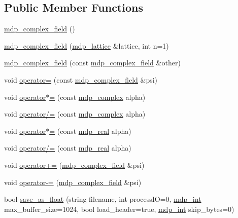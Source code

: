 \subsection*{Public Member Functions}
\begin{DoxyCompactItemize}
\item 
\hyperlink{classmdp__complex__field_aa629a99588ce79fe33fafb6db4f8226a}{mdp\_\-complex\_\-field} ()
\item 
\hyperlink{classmdp__complex__field_a26b3b0f65609dd18e7438329ff651fd1}{mdp\_\-complex\_\-field} (\hyperlink{classmdp__lattice}{mdp\_\-lattice} \&lattice, int n=1)
\item 
\hyperlink{classmdp__complex__field_a68da5a2521de552a614831c39a14930a}{mdp\_\-complex\_\-field} (const \hyperlink{classmdp__complex__field}{mdp\_\-complex\_\-field} \&other)
\item 
void \hyperlink{classmdp__complex__field_ad2b736ae31e3ee1f955c10f6ad40928f}{operator=} (const \hyperlink{classmdp__complex__field}{mdp\_\-complex\_\-field} \&psi)
\item 
void \hyperlink{classmdp__complex__field_a530256e46fe46c7422cbba8381891636}{operator$\ast$=} (const \hyperlink{classmdp__complex}{mdp\_\-complex} alpha)
\item 
void \hyperlink{classmdp__complex__field_ab204658a9026e7936b8725ad4f3172ef}{operator/=} (const \hyperlink{classmdp__complex}{mdp\_\-complex} alpha)
\item 
void \hyperlink{classmdp__complex__field_af890e25006822910f411ce10ba7dfc7a}{operator$\ast$=} (const \hyperlink{mdp__global__vars_8h_a049e4c1d4e74d644878a42f9909463e4}{mdp\_\-real} alpha)
\item 
void \hyperlink{classmdp__complex__field_a0d2bffa4819135c1ef77c0c9fb22504e}{operator/=} (const \hyperlink{mdp__global__vars_8h_a049e4c1d4e74d644878a42f9909463e4}{mdp\_\-real} alpha)
\item 
void \hyperlink{classmdp__complex__field_a2278eac1ee19b8ca1c3c6b7319f6525d}{operator+=} (\hyperlink{classmdp__complex__field}{mdp\_\-complex\_\-field} \&psi)
\item 
void \hyperlink{classmdp__complex__field_a0385e35ddfd532f15e817dcac1adf212}{operator-\/=} (\hyperlink{classmdp__complex__field}{mdp\_\-complex\_\-field} \&psi)
\item 
bool \hyperlink{classmdp__complex__field_a27b6db7d432105f65b42c970ea340482}{save\_\-as\_\-float} (string filename, int processIO=0, \hyperlink{mdp__global__vars_8h_aaa1ad9d0dcd2124aa5af0120d9954174}{mdp\_\-int} max\_\-buffer\_\-size=1024, bool load\_\-header=true, \hyperlink{mdp__global__vars_8h_aaa1ad9d0dcd2124aa5af0120d9954174}{mdp\_\-int} skip\_\-bytes=0)

\end{DoxyCompactItemize}

